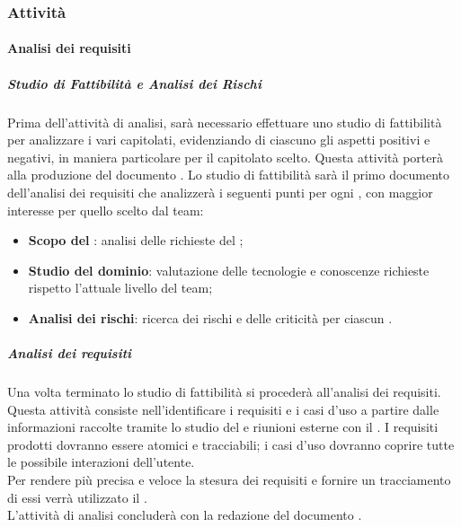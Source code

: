 \subsubsection{Attività}
\label{sec:2.1.1}
		\paragraph{Analisi dei requisiti}
		\label{sec:2.1.1.1}
			\subparagraph{Studio di Fattibilità e Analisi dei Rischi}
			\label{sec:2.1.1.1.1}
				Prima dell'attività di analisi, sarà necessario effettuare uno studio di fattibilità per analizzare i vari capitolati, evidenziando di ciascuno gli aspetti positivi e negativi, in maniera particolare per il capitolato scelto. Questa attività porterà alla produzione del documento \SFdoc.
				Lo studio di fattibilità sarà il primo documento dell'analisi dei requisiti che analizzerà i seguenti punti per ogni , con maggior interesse per quello scelto dal team:
				\begin{itemize}
					\item \textbf{Scopo del }: analisi delle richieste del ;
					\item \textbf{Studio del dominio}: valutazione delle tecnologie e conoscenze richieste rispetto l'attuale livello del team;
					\item \textbf{Analisi dei rischi}: ricerca dei rischi e delle criticità per ciascun .
				\end{itemize}
			\subparagraph{Analisi dei requisiti}
			\label{sec:2.1.1.1.2}
				Una volta terminato lo studio di fattibilità si procederà all'analisi dei requisiti. \\
				Questa attività consiste nell'identificare i requisiti e i casi d'uso a partire dalle informazioni raccolte tramite lo studio del  e riunioni esterne con il . I requisiti prodotti dovranno essere atomici e tracciabili; i casi d'uso dovranno coprire tutte le possibile interazioni dell'utente. \\
				Per rendere più precisa e veloce la stesura dei requisiti e fornire un tracciamento di essi verrà utilizzato il  . \\
				L'attività di analisi concluderà con la redazione del documento \ARdoc.

